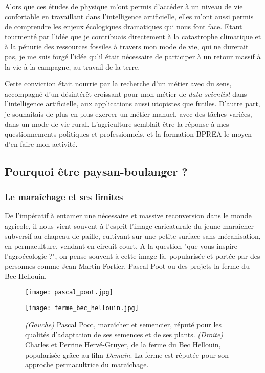 \documentclass{book}
\begin{document}
Alors que ces études de physique m'ont permis d'accéder à un niveau de vie confortable en travaillant dans l'intelligence artificielle, elles m'ont aussi permis de comprendre les enjeux écologiques dramatiques qui nous font face. Etant tourmenté par l'idée que je contribuais directement à la catastrophe climatique et à la pénurie des ressources fossiles à travers mon mode de vie, qui ne durerait pas, je me suis forgé l'idée qu'il était nécessaire de participer à un retour massif à la vie à la campagne, au travail de la terre. 

Cette conviction était nourrie par la recherche d'un métier avec du sens, accompagné d'un désintérêt croissant pour mon métier de \textit{data scientist} dans l'intelligence artificielle, aux applications aussi utopistes que futiles. D'autre part, je souhaitais de plus en plus exercer un métier manuel, avec des tâches variées, dans un mode de vie rural. L'agriculture semblait être la réponse à mes questionnements politiques et professionnels, et la formation BPREA le moyen d'en faire mon activité.

\subsection{Pourquoi être paysan-boulanger ?}

\subsubsection{Le maraîchage et ses limites}

De l'impératif à entamer une nécessaire et massive reconversion dans le monde agricole, il nous vient souvent à l'esprit l'image caricaturale du jeune maraîcher subversif au chapeau de paille, cultivant sur une petite surface sans mécanisation, en permaculture, vendant en circuit-court. A la question "que vous inspire l'agroécologie ?", on pense souvent à cette image-là, popularisée et portée par des personnes comme Jean-Martin Fortier, Pascal Poot ou des projets la ferme du Bec Hellouin. 

\begin{figure}[h!]
\centering
\begin{minipage}{.5\textwidth}
  \centering
  \texttt{[image: pascal\_poot.jpg]}
  \label{fig:test1}
\end{minipage}%
\begin{minipage}{.5\textwidth}
  \centering
  \texttt{[image: ferme\_bec\_hellouin.jpg]}
  \label{fig:test2}
\end{minipage}
\caption{\textit{(Gauche)} Pascal Poot, maraîcher et semencier, réputé pour les qualités d'adaptation de ses semences et de ses plants. \textit{(Droite)} Charles et Perrine Hervé-Gruyer, de la ferme du Bec Hellouin, popularisée grâce au film \textit{Demain}. La ferme est réputée pour son approche permacultrice du maraîchage.}
\label{fig:test}
\end{figure}
\end{document}
